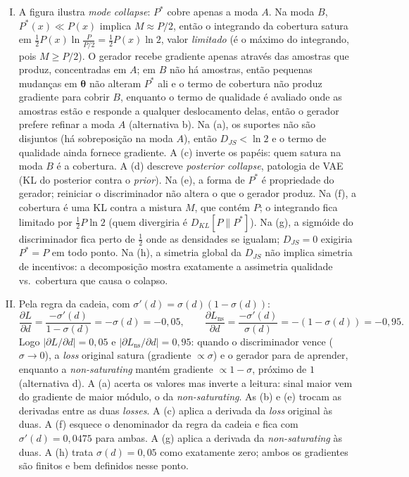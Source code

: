 \documentclass{dlproblemset}
\newcommand{\thetav}{\boldsymbol{\theta}}
\begin{document}
\begin{enumerate}[I)]
    \item A figura ilustra \textit{mode collapse}: $P^{*}$ cobre apenas a moda $A$. Na moda $B$, $P^{*}(x) \ll P(x)$ implica $M \approx P/2$, então o integrando da cobertura satura em $\tfrac{1}{2}P(x)\ln\!\tfrac{P}{P/2} = \tfrac{1}{2}P(x)\ln 2$, valor \emph{limitado} (é o máximo do integrando, pois $M \ge P/2$). O gerador recebe gradiente apenas através das amostras que produz, concentradas em $A$; em $B$ não há amostras, então pequenas mudanças em $\thetav$ não alteram $P^{*}$ ali e o termo de cobertura não produz gradiente para cobrir $B$, enquanto o termo de qualidade é avaliado onde as amostras estão e responde a qualquer deslocamento delas, então o gerador prefere refinar a moda $A$ (alternativa b). Na (a), os suportes não são disjuntos (há sobreposição na moda $A$), então $D_{JS} < \ln 2$ e o termo de qualidade ainda fornece gradiente. A (c) inverte os papéis: quem satura na moda $B$ é a cobertura. A (d) descreve \textit{posterior collapse}, patologia de VAE (KL do posterior contra o \textit{prior}). Na (e), a forma de $P^{*}$ é propriedade do gerador; reiniciar o discriminador não altera o que o gerador produz. Na (f), a cobertura é uma KL contra a mistura $M$, que contém $P$; o integrando fica limitado por $\tfrac{1}{2}P\ln 2$ (quem divergiria é $D_{KL}[P\|P^{*}]$). Na (g), a sigmóide do discriminador fica perto de $\tfrac{1}{2}$ onde as densidades se igualam; $D_{JS} = 0$ exigiria $P^{*} = P$ em todo ponto. Na (h), a simetria global da $D_{JS}$ não implica simetria de incentivos: a decomposição mostra exatamente a assimetria qualidade vs.\ cobertura que causa o colapso.

    \item Pela regra da cadeia, com $\sigma'(d) = \sigma(d)(1 - \sigma(d))$:
    \[
    \frac{\partial L}{\partial d} = \frac{-\sigma'(d)}{1 - \sigma(d)} = -\sigma(d) = -0{,}05, \qquad
    \frac{\partial L_{\text{ns}}}{\partial d} = \frac{-\sigma'(d)}{\sigma(d)} = -(1 - \sigma(d)) = -0{,}95.
    \]
    Logo $\left|\partial L / \partial d\right| = 0{,}05$ e $\left|\partial L_{\text{ns}} / \partial d\right| = 0{,}95$: quando o discriminador vence ($\sigma \to 0$), a \textit{loss} original satura (gradiente $\propto \sigma$) e o gerador para de aprender, enquanto a \textit{non-saturating} mantém gradiente $\propto 1 - \sigma$, próximo de $1$ (alternativa d). A (a) acerta os valores mas inverte a leitura: sinal maior vem do gradiente de maior módulo, o da \textit{non-saturating}. As (b) e (e) trocam as derivadas entre as duas \textit{losses}. A (c) aplica a derivada da \textit{loss} original às duas. A (f) esquece o denominador da regra da cadeia e fica com $\sigma'(d) = 0{,}0475$ para ambas. A (g) aplica a derivada da \textit{non-saturating} às duas. A (h) trata $\sigma(d) = 0{,}05$ como exatamente zero; ambos os gradientes são finitos e bem definidos nesse ponto.
\end{enumerate}
\color{black}
\end{document}
